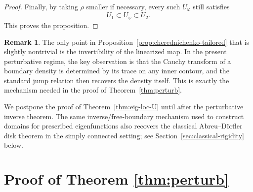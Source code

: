 \documentclass[a4paper,11pt,reqno]{amsart}
\numberwithin{equation}{section}
\theoremstyle{plain} %
\theoremstyle{definition} %
\newtheorem{remark}{Remark}[section]
\theoremstyle{remark}
\begin{document}
\begin{proof}
Finally, by taking \(\rho\) smaller if necessary, every such \(U_\varphi\) still
satisfies
\[
U_1\subset U_\varphi\subset U_2.
\]
This proves the proposition.
\end{proof}

\begin{remark}
The only point in Proposition~\ref{prop:cherednichenko-tailored} that is slightly
nontrivial is the invertibility of the linearized map. In the present perturbative
regime, the key observation is that the Cauchy transform of a boundary density is
determined by its trace on any inner contour, and the standard jump relation then
recovers the density itself. This is exactly the mechanism needed in the proof of
Theorem~\ref{thm:perturb}.
\end{remark}

\medskip

We postpone the proof of Theorem~\ref{thm:eig-loc-U} until after the perturbative
inverse theorem. The same inverse/free-boundary mechanism used to construct
domains for prescribed eigenfunctions also recovers the classical
Abreu--D\"orfler disk theorem in the simply connected setting; see
Section~\ref{sec:classical-rigidity} below.

\section{Proof of Theorem \ref{thm:perturb}} 
\end{document}
